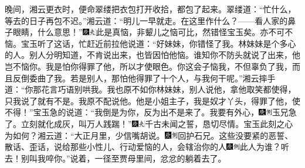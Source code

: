 晚间，湘云更衣时，便命翠缕把衣包打开收拾，都包了起来。翠缕道：``忙什么，等去的日子再包不迟。''湘云道：``明儿一早就走。在这里作什么？------看人家的鼻子眼睛，什么意思！''{\includegraphics[width=3mm]{../Images/00004}\includegraphics[width=3mm]{../Images/00012}\footnotesize \kaishu 此是真恼，非颦儿之恼可比，然错怪宝玉矣。亦不可不恼。}宝玉听了这话，忙赶近前拉他说道：``好妹妹，你错怪了我。林妹妹是个多心的人。别人分明知道，不肯说出来，也皆因怕他恼。谁知你不防头就说了出来，他岂不恼你。我是怕你得罪了他，所以才使眼色。你这会子恼我，不但辜负了我，而且反倒委曲了我。若是别人，那怕他得罪了十个人，与我何干呢。''湘云摔手道：``你那花言巧语别哄我。我也原不如你林妹妹，别人说他，拿他取笑都使得，只我说了就有不是。我原不配说他。他是小姐主子，我是奴才丫头，得罪了他，使不得！''宝玉急的说道：``我倒是为你，反为出不是来了。我要有外心，{\includegraphics[width=3mm]{../Images/00004}\includegraphics[width=3mm]{../Images/00011}\footnotesize \kaishu 玉兄急了。}立刻就化成灰，叫万人践踹！''{\includegraphics[width=3mm]{../Images/00004}\includegraphics[width=3mm]{../Images/00012}\footnotesize \kaishu 千古未闻之誓，恳切尽情。宝玉此刻之心为如何？}湘云道：``大正月里，少信嘴胡说。{\includegraphics[width=3mm]{../Images/00004}\includegraphics[width=3mm]{../Images/00011}\footnotesize \kaishu 回护石兄。}这些没要紧的恶誓、散话、歪话，说给那些小性儿、行动爱恼的人，会辖治你的人{\includegraphics[width=3mm]{../Images/00004}\includegraphics[width=3mm]{../Images/00011}\footnotesize \kaishu 此人为谁？}听去！别叫我啐你。''说着，一径至贾母里间，忿忿的躺着去了。

